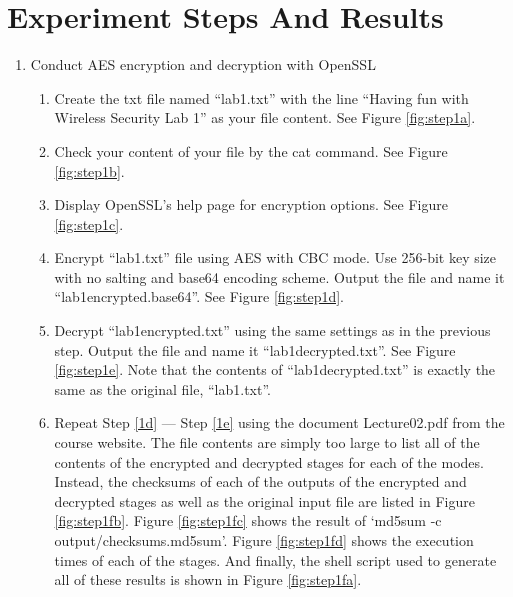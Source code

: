 \documentclass{article}
\begin{document}

\section{Experiment Steps And Results}

\begin{enumerate}
\item \label{step1} Conduct AES encryption and decryption with OpenSSL
    \begin{enumerate}
        \item \label{1a} Create the txt file named ``lab1.txt'' with the line ``Having
               fun with Wireless Security Lab 1'' as your file content. See Figure \ref{fig:step1a}.
        \item \label{1b} Check your content of your file by the cat command. See Figure
               \ref{fig:step1b}. 
        \item \label{1c} Display OpenSSL's help page for encryption options. See Figure \ref{fig:step1c}.
        \item \label{1d} Encrypt ``lab1.txt'' file using AES with CBC mode. Use 256-bit key size 
              with no salting and base64 encoding scheme. Output the file and name it
              ``lab1\textunderscore encrypted.base64''. See Figure \ref{fig:step1d}.
        \item \label{1e} Decrypt ``lab1\textunderscore encrypted.txt” using the same settings as in the previous
              step. Output the file and name it ``lab1\textunderscore decrypted.txt''.
              See Figure \ref{fig:step1e}. Note that the contents of
              ``lab1\textunderscore decrypted.txt'' is exactly the same as the original file,
              ``lab1.txt''.
        \item Repeat Step \ref{1d} --- Step \ref{1e} using the document Lecture02.pdf from the course website.
              The file contents are simply too large to list all of the contents of the encrypted and decrypted
              stages for each of the modes. Instead, the checksums of each of the outputs of the encrypted and
              decrypted stages as well as the original input file are listed in Figure \ref{fig:step1fb}. Figure
              \ref{fig:step1fc} shows the result of `md5sum -c output/checksums.md5sum'. Figure
              \ref{fig:step1fd} shows the execution times of each of the stages. And finally, the shell script
              used to generate all of these results is shown in Figure \ref{fig:step1fa}.

    \end{enumerate}
\end{enumerate}
\end{document}
